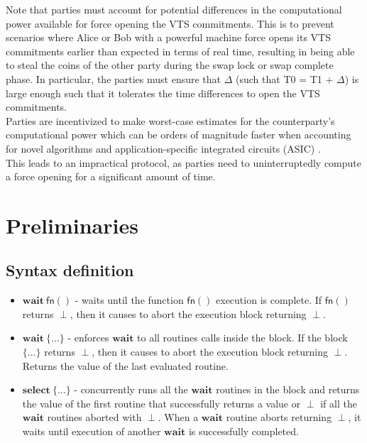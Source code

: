 \documentclass{article}      	%
\begin{document}
Note that parties must account for potential differences in the computational power available for force opening the VTS commitments. This is to prevent scenarios where Alice or Bob with a powerful machine force opens its VTS commitments earlier than expected in terms of real time, resulting in being able 
to steal the coins of the other party during the swap lock or swap complete phase. In particular, the parties must ensure that $\Delta$ (such that T0 = T1 + $\Delta$) is large enough such that it tolerates the time differences to open the VTS commitments. \\

Parties are incentivized to make worst-case estimates for the counterparty's computational power which can be orders of magnitude faster when accounting for novel algorithms \cite{squaring_algo} and application-specific integrated circuits (ASIC) \cite{squaring_asic}. \\
This leads to an impractical protocol, as parties need to uninterruptedly compute a force opening for a significant amount of time.

\section{Preliminaries}


\subsection{Syntax definition}

\begin{itemize}[nosep, noitemsep] 
    \item $\mathbf{wait} \: \mathsf{fn}()$ - waits until the function $\mathsf{fn}()$ execution is complete. If $\mathsf{fn}()$ returns $\perp$, then it causes to abort the execution block returning $\perp$. \\
    \item $\mathbf{wait} \: \{...\}$ - enforces $\mathbf{wait}$ to all routines calls inside the block. If the block $\{...\}$ returns $\perp$, then it causes to abort the execution block returning $\perp$. Returns the value of the last evaluated routine. \\
    \item $\mathbf{select} \: \{...\}$ - concurrently runs all the $\mathbf{wait}$ routines in the block and returns the value of the first routine that successfully returns a value or $\perp$ if all the $\mathbf{wait}$ routines aborted with $\perp$. When a $\mathbf{wait}$ routine aborts returning $\perp$, it waits until execution of another $\mathbf{wait}$ is successfully completed. \\
\end{itemize}
\end{document}
